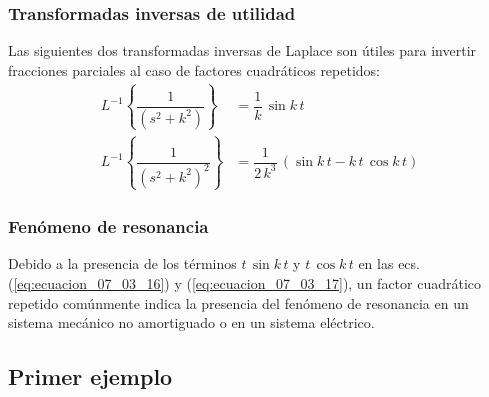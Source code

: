 \begin{frame}
\frametitle{Transformadas inversas de utilidad}
Las siguientes dos transformadas inversas de Laplace son útiles para invertir fracciones parciales al caso de factores cuadráticos repetidos:
\begin{align}
L^{-1} \left\{ \dfrac{1}{(s^{2} + k^{2})} \right\} &= \dfrac{1}{ k} \, \sin k \, t \label{eq:ecuacion_07_03_16} \\[0.5em]
L^{-1} \left\{ \dfrac{1}{(s^{2} + k^{2})^{2}} \right\} &= \dfrac{1}{2 \, k^{3}} \, (\sin k \, t - k \, t \, \cos k \, t) \label{eq:ecuacion_07_03_17}
\end{align}
\end{frame}
\begin{frame}
\frametitle{Fenómeno de resonancia}
Debido a la presencia de los términos $t \, \sin k \, t$ y $t \, \cos k \, t$ en las ecs. (\ref{eq:ecuacion_07_03_16}) y (\ref{eq:ecuacion_07_03_17}), un factor cuadrático repetido comúnmente indica la presencia del fenómeno de resonancia en un sistema mecánico no amortiguado o en un sistema eléctrico.
\end{frame}

\subsection{Primer ejemplo}

